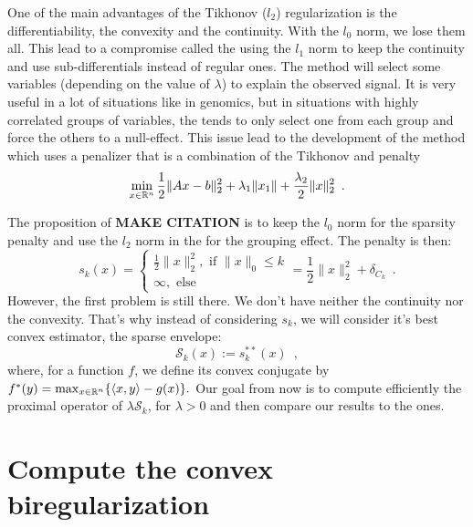 \documentclass{article}
\begin{document}
One of the main advantages of the Tikhonov ($l_2$) regularization is the differentiability, the convexity and the continuity. With the $l_0$ norm, we lose them all. This lead to a compromise called the \lasso using the $l_1$ norm to keep the continuity and use sub-differentials instead of regular ones. The \lasso method will select some variables (depending on the value of $\lambda$) to explain the observed signal. It is very useful in a lot of situations like in genomics, but in situations with highly correlated groups of variables, the \lasso tends to only select one from each group and force the others to a null-effect. This issue lead to the development of the \enet method which uses a penalizer that is a combination of the Tikhonov and \lasso penalty
\[\min_{x\in\mathbb{R}^n} \frac{1}{2}\|Ax-b\|^2_2 + \lambda_1 \|x_1\| +  \frac{\lambda_2}{2}\|x\|^2_2\enspace.\]

The proposition of \textbf{MAKE CITATION} is to keep the $l_0$ norm for the sparsity penalty and use the $l_2$ norm in the \enet for the grouping effect. The penalty is then:
\[s_k(x)=\begin{cases} \frac{1}{2}\|x\|_2^2, \text{ if } \|x\|_0\leq k\\
\infty, \text{ else}\end{cases} = \frac{1}{2}\|x\|_2^2 + \delta_{C_k}\enspace.\]
However, the first problem is still there. We don't have neither the continuity nor the convexity. That's why instead of considering $s_k$, we will consider it's best convex estimator, the sparse envelope:
\[ \mathcal{S}_k(x) := s_k^{**}(x)\enspace,\]
where, for a function $f$, we define its convex conjugate by  $f^*(y)=\max_{x\in\mathbb{R}^n}\{\langle x, y\rangle - g(x)\}.$
Our goal from now is to compute efficiently the proximal operator of $\lambda \mathcal{S}_k$, for $\lambda >0$ and then compare our results to the \enet ones.


\section{Compute the convex biregularization}

\end{document}
